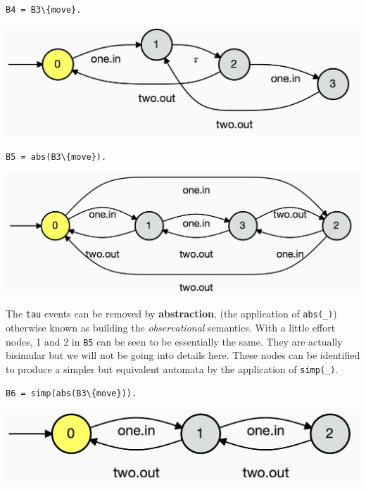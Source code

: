 \documentclass[]{article}
\begin{document}
\begin{minipage}{0.45\textwidth}
\noindent\begin{center}\verb$B4 = B3\{move}.$

 \includegraphics[scale=0.15]{B4.jpg} \end{center}
 \end{minipage}
\begin{minipage}{0.45\textwidth}
\noindent\begin{center}\verb$B5 = abs(B3\{move}).$

 \includegraphics[scale=0.15]{B5.jpg} \end{center}
 \end{minipage}

The \verb$tau$ events  can be removed by {\bf abstraction}, (the application of \verb$abs(_)$) otherwise known as building the \emph{observational} semantics.  With a little effort nodes, 1 and 2 in \verb$B5$ can be seen to be  essentially the same.  They are actually bisimular but we will not be going into details here. These nodes can be identified to produce a simpler but equivalent automata by the application of \verb$simp(_)$.



\noindent\begin{center}\verb$B6 = simp(abs(B3\{move})).$

 \includegraphics[scale=0.15]{B6.jpg} \end{center}
\end{document}
